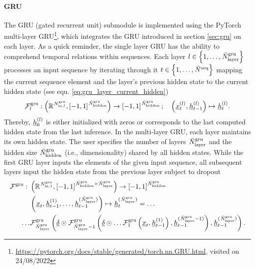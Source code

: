 \newcommand{\GRUMap}{\Func[]{\gru}{}{}{}}
\newcommand{\GRUDropout}{\underline\delta}
\newcommand{\GRUDropoutP}{\prob[\user]{\gru}{}{}{}}
\newcommand{\GRUNumP}{\num[]{\gru}{\params}{}{}}

\paragraph*{GRU} ${}$\\
The GRU (gated recurrent unit) submodule
is implemented using the PyTorch
multi-layer GRU\footnote{
    \url{https://pytorch.org/docs/stable/generated/torch.nn.GRU.html}, visited on 24/08/2022
},
which integrates the GRU \cite{Cho2014} 
introduced in section \ref{sec:gru} on each layer.
As a quick reminder, 
the single layer GRU 
has the ability to comprehend temporal relations within sequences.
Each layer 
$l \in \setOfInts{1, \dots, \GRUNumLayer}$ 
processes an input sequence by
iterating through it
$t \in \setOfInts{1, \dots, \seqLen}$ 
mapping the current sequence element
and the layer's previous hidden state
to the current hidden state (see equ. \ref{eq:gru_layer_current_hidden})
\begin{align}
    \GRULayerMap{l}
    :
    \tuple{
        \R{\GRUInp{l}}, 
        \setR{-1, 1}^{\GRUHiddenSize}
    }
    \rightarrow 
    \setR{-1, 1}^{\GRUHiddenSize}
    ;\quad
    \tuple{\featvec[]{(l)}{t}{}{}, \hiddenstate[]{(l)}{t-1}{}{}}
    \mapsto
    \hiddenstate[]{(l)}{t}{}{}.
\end{align}
Thereby, $\hiddenstate[]{(l)}{0}{}{}$ is either initialized with zeros 
or corresponds to the last computed hidden state from the last inference.
 In the multi-layer GRU,
each layer maintains its own hidden state.
The user specifies the number of layers 
$\GRUNumLayer$
and the hidden size 
$\GRUHiddenSize$ (i.e., dimensionality) shared by all hidden states.
While the first GRU layer inputs the elements of the given input sequence,
all subsequent layers input the hidden state from the previous layer subject to dropout
\begin{align} \label{eq:gru}
    \GRUMap
    :\ &
    \tuple{
        \R{\GRUInp{1}},
        \setR{-1, 1}^{\GRUHiddenSize \times \GRUNumLayer}
    }
    \rightarrow 
    \setR{-1, 1}^{\GRUHiddenSize}
    \nonumber \\
    &\tuple{
        \featvec[]{}{t}{}{}, 
        \hiddenstate[]{(1)}{t-1}{}{},
        \dots,
        \hiddenstate[]{(\GRUNumLayer)}{t-1}{}{}
    }
    \mapsto 
    \hiddenstate[]{(\GRUNumLayer)}{t}{}{} =
    \dots
    \nonumber \\
    \dots &\GRULayerMap{\GRUNumLayer} \tuple{
        \GRUDropout \odot
        \GRULayerMap{\GRUNumLayer - 1} \tuple{
            \GRUDropout \odot
                \dots \GRULayerMap{1} \tuple{
                    \featvec[]{}{t}{}{}
                    ,
                    \hiddenstate[]{(1)}{t-1}{}{}
                }
            ,
            \hiddenstate[]{(\GRUNumLayer-1)}{t-1}{}{}
        },
        \hiddenstate[]{(\GRUNumLayer)}{t-1}{}{}
    }
    .
\end{align}
